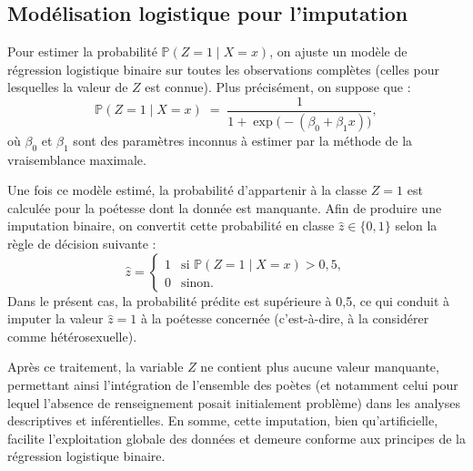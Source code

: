 \subsection{Modélisation logistique pour l’imputation}
Pour estimer la probabilité \(\mathbb{P}(Z = 1 \mid X = x)\), on ajuste un modèle de régression logistique binaire sur toutes les observations complètes (celles pour lesquelles la valeur de \(Z\) est connue). Plus précisément, on suppose que :
\[
\mathbb{P}(Z = 1 \mid X = x)
\;=\; \frac{1}{1 + \exp\bigl(-(\beta_0 + \beta_1 x)\bigr)},
\]
où \(\beta_0\) et \(\beta_1\) sont des paramètres inconnus à estimer par la méthode de la vraisemblance maximale.

Une fois ce modèle estimé, la probabilité d’appartenir à la classe \(Z=1\) est calculée pour la poétesse dont la donnée est manquante. Afin de produire une imputation binaire, on convertit cette probabilité en classe \(\hat{z}\in\{0,1\}\) selon la règle de décision suivante :
\[
\hat{z} =
\begin{cases}
	1 & \text{si } \mathbb{P}(Z = 1 \mid X = x) > 0{,}5, \\
	0 & \text{sinon.}
\end{cases}
\]
Dans le présent cas, la probabilité prédite est supérieure à 0,5, ce qui conduit à imputer la valeur \(\hat{z} = 1\) à la poétesse concernée (c’est-à-dire, à la considérer comme hétérosexuelle).

Après ce traitement, la variable \(Z\) ne contient plus aucune valeur manquante, permettant ainsi l’intégration de l’ensemble des poètes (et notamment celui pour lequel l’absence de renseignement posait initialement problème) dans les analyses descriptives et inférentielles. En somme, cette imputation, bien qu’artificielle, facilite l’exploitation globale des données et demeure conforme aux principes de la régression logistique binaire.
